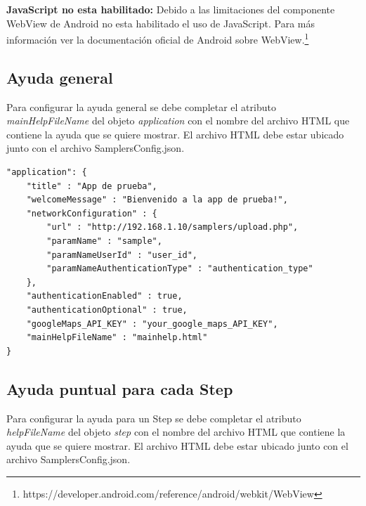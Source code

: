 \textbf{JavaScript no esta habilitado:} Debido a las limitaciones del componente WebView de Android no esta habilitado el uso de JavaScript. Para más información ver la documentación oficial de Android sobre WebView.\footnote{https://developer.android.com/reference/android/webkit/WebView}

\subsection{Ayuda general}
Para configurar la ayuda general se debe completar el atributo \textit{mainHelpFileName} del objeto \textit{application} con el nombre del archivo HTML que contiene la ayuda que se quiere mostrar. El archivo HTML debe estar ubicado junto con el archivo SamplersConfig.json.

\begin{lstlisting}[language=XML, frame=tlbr, caption=Ejemplo de configuración de ayuda general (línea 13).]
"application": {
	"title" : "App de prueba",
	"welcomeMessage" : "Bienvenido a la app de prueba!",
	"networkConfiguration" : {
		"url" : "http://192.168.1.10/samplers/upload.php",
		"paramName" : "sample",
		"paramNameUserId" : "user_id",
		"paramNameAuthenticationType" : "authentication_type"
	},
	"authenticationEnabled" : true,
	"authenticationOptional" : true,
	"googleMaps_API_KEY" : "your_google_maps_API_KEY",
	"mainHelpFileName" : "mainhelp.html"
}
\end{lstlisting}

\subsection{Ayuda puntual para cada Step}
Para configurar la ayuda para un Step se debe completar el atributo \textit{helpFileName} del objeto \textit{step} con el nombre del archivo HTML que contiene la ayuda que se quiere mostrar. El archivo HTML debe estar ubicado junto con el archivo SamplersConfig.json.

